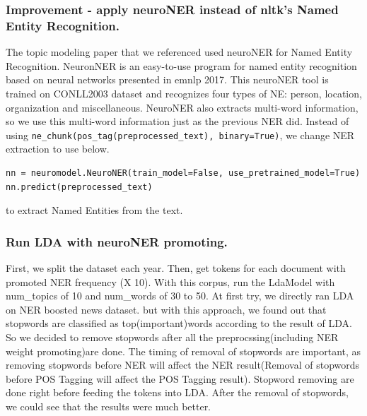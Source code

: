 \subsubsection{Improvement - apply neuroNER instead of nltk's Named Entity Recognition.} 
The topic modeling paper that we referenced used neuroNER for Named Entity Recognition. NeuronNER is an easy-to-use program for named entity recognition based on neural networks presented in emnlp 2017. \cite{2017neuroner} This neuroNER tool is trained on CONLL2003 dataset and recognizes four types of NE: person, location, organization and miscellaneous. NeuroNER also extracts multi-word information, so we use this multi-word information just as the previous NER did. Instead of using
\texttt{ne_chunk(pos_tag(preprocessed_text), binary=True)}, we change NER extraction to use below.

\begin{verbatim}
nn = neuromodel.NeuroNER(train_model=False, use_pretrained_model=True)
nn.predict(preprocessed_text)
\end{verbatim}
to extract Named Entities from the text.

\subsubsection{Run LDA with neuroNER promoting.}
First, we split the dataset each year. Then, get tokens for each document with promoted NER frequency (X 10). With this corpus, run the LdaModel with num\_topics of 10 and num\_words of 30 to 50. At first try, we directly ran LDA on NER boosted news dataset. but with this approach, we found out that stopwords are classified as top(important)words according to the result of LDA. So we decided to remove stopwords after all the preprocssing(including NER weight promoting)are done. The timing of removal of stopwords are important, as removing stopwords before NER will affect the NER result(Removal of stopwords before POS Tagging will affect the POS Tagging result). Stopword removing are done right before feeding the tokens into LDA. After the removal of stopwords, we could see that the results were much better.

